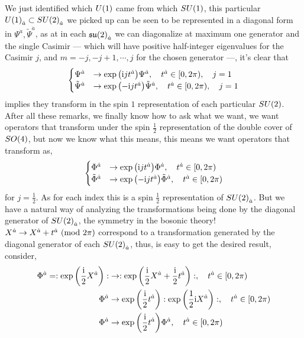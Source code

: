 We just identified which $U\qty(1)$ came from which $SU\qty(1)$, this particular $U\qty(1)_{\dot a}\subset SU\qty(2)_{\dot a}$ we picked up 
can be seen to be represented in a diagonal form in $\Psi^{\dot a},{\tilde\Psi}^{\dot a}$, as at in each $\mathfrak{su}\qty(2)_{\dot a}$ we 
can diagonalize at maximum one generator and the single Casimir --- which will have positive half-integer eigenvalues for the Casimir $j$, 
and $m=-j,-j+1,\cdots,j$ for the chosen generator ---, it's clear that 
\begin{align*}
    \begin{cases}
        \Psi^{\dot a}&\rightarrow\exp\qty(\textnormal{i} j t^{\dot a})\Psi^{\dot a},\ \ \ t^{\dot a}\in[0,2\pi),\ \ \ j=1\\
        {\tilde\Psi}^{\dot a}&\rightarrow\exp\qty(-\textnormal{i} j t^{\dot a}){\tilde\Psi}^{\dot a},\ \ \ t^{\dot a}\in[0,2\pi),\ \ \ j=1
    \end{cases}
\end{align*}
implies they transform in the spin $1$ representation of each particular $SU\qty(2)$. After all these remarks, 
we finally know how to ask what we want, we want operators that transform under the spin $\frac12$ representation 
of the double cover of $SO\qty(4)$, but now we know what this means, this means we want operators that transform as,
\begin{align*}
    \begin{cases}
        \Phi^{\dot a}&\rightarrow\exp\qty(\textnormal{i} j t^{\dot a})\Phi^{\dot a},\ \ \ t^{\dot a}\in[0,2\pi)\\
        {\tilde\Phi}^{\dot a}&\rightarrow\exp\qty(-\textnormal{i} j t^{\dot a}){\tilde\Phi}^{\dot a},\ \ \ t^{\dot a}\in[0,2\pi)
    \end{cases}
\end{align*}
for $j=\frac12$. As for each index this is a spin $\frac12$ representation of $SU\qty(2)_{\dot a}$. But we have a natural way of 
analyzing the transformations being done by the diagonal generator of $SU\qty(2)_{\dot a}$, the symmetry in the bosonic theory! 
$X^{\dot a}\rightarrow X^{\dot a}+t^{\dot a}\ \qty(\textnormal{mod }2\pi)$ correspond to a transformation generated by the diagonal 
generator of each $SU\qty(2)_{\dot a}$, thus, is easy to get the desired result, consider,
\begin{align*}
    \Phi^{\dot a}=:\exp\qty(\frac{\textnormal{i}}2 X^{\dot a}):&\rightarrow:\exp\qty(\frac{\textnormal{i}}2 X^{\dot a}+\frac{\textnormal{i}}2 t^{\dot a}):,\ \ \ t^{\dot a}\in[0,2\pi)\\
    \Phi^{\dot a}&\rightarrow\exp\qty(\frac{\textnormal{i}}2 t^{\dot a}):\exp\qty(\frac12\textnormal{i} X^{\dot a}):,\ \ \ t^{\dot a}\in[0,2\pi)\\
    \Phi^{\dot a}&\rightarrow\exp\qty(\frac{\textnormal{i}}2 t^{\dot a})\Phi^{\dot a},\ \ \ t^{\dot a}\in[0,2\pi)
\end{align*}
